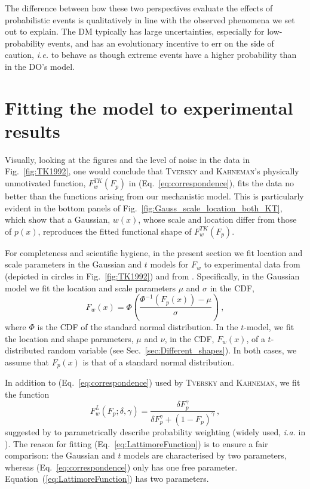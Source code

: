 \documentclass[a4paper, 12pt]{article}
\newcommand{\person}[1]{\textsc{#1}\xspace}
\newcommand{\elabel}[1]{\label{eq:#1}}
\newcommand{\eref}[1]{(Eq.~\ref{eq:#1})}
\newcommand{\Eref}[1]{Equation~(\ref{eq:#1})}
\newcommand{\fref}[1]{Fig.~\ref{fig:#1}}
\newcommand{\seclabel}[1]{\label{sec:#1}}
\newcommand{\secref}[1]{Sec.~\ref{sec:#1}}
\newcommand{\ia}{\textit{i.a.}\xspace}
\newcommand{\ie}{\textit{i.e.}\xspace}
\newcommand{\be}{\begin{equation}}
\newcommand{\ee}{\end{equation}}
\begin{document}
The difference between how these two perspectives evaluate the effects of probabilistic events is qualitatively in line with the observed phenomena we set out to explain. The DM typically has large uncertainties, especially for low-probability events, and has an evolutionary incentive to err on the side of caution, \ie to behave as though extreme events have a higher probability than in the DO's model.

\section{Fitting the model to experimental results \seclabel{Fitting_the}}
Visually, looking at the figures and the level of noise in the data in \fref{TK1992}, one would conclude that \person{Tversky} and \person{Kahneman}'s physically unmotivated function, $F^{TK}_w(F_p)$ in \eref{correspondence}, fits the data no better than the functions arising from our mechanistic model. This is particularly evident in the bottom panels of \fref{Gauss_scale_location_both_KT}, which show that a Gaussian, $w(x)$, whose scale and location differ from those of $p(x)$, reproduces the fitted functional shape of $F^{TK}_w(F_p)$.

For completeness and scientific hygiene, in the present section we fit location and scale parameters in the Gaussian and $t$ models for $F_w$ to experimental data from \textcite{PrestonBaratta1948} (depicted in circles in \fref{TK1992}) and from \textcite{TverskyFox1995}. Specifically, in the Gaussian model we fit the location and scale parameters $\mu$ and $\sigma$ in the CDF,
%
\be
F_w\left(x\right) = \Phi\left(\frac{\Phi^{-1}\left(F_p\left(x\right)\right) - \mu}{\sigma}\right)~,
\ee
%
where $\Phi$ is the CDF of the standard normal distribution. In the $t$-model, we fit the location and shape parameters, $\mu$ and $\nu$, in the CDF, $F_w(x)$, of a $t$-distributed random variable (see \secref{Different_shapes}). In both cases, we assume that $F_p(x)$ is that of a standard normal distribution.

In addition to \eref{correspondence} used by \person{Tversky} and \person{Kahneman}, we fit the function
%
\be
F^{L}_w\left(F_p; \delta,\gamma\right) =\frac{\delta F_p^{\gamma}}{\delta F_p^{\gamma} + \left(1-F_p\right)^{\gamma}}\,,
\elabel{LattimoreFunction}
\ee
%
suggested by \textcite{LattimoreBakerWitte1992} to parametrically describe probability weighting (widely used, \ia in \textcite{TverskyWakker1995,Prelec1998}). The reason for fitting \eref{LattimoreFunction} is to ensure a fair comparison: the Gaussian and $t$ models are characterised by two parameters, whereas \eref{correspondence} only has one free parameter. \Eref{LattimoreFunction} has two parameters.
\end{document}
